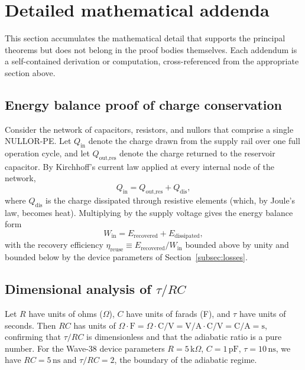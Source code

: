 \section{Detailed mathematical addenda}
\label{sec:math_addenda}

This section accumulates the mathematical detail that supports the principal
theorems but does not belong in the proof bodies themselves.  Each addendum is a
self-contained derivation or computation, cross-referenced from the appropriate
section above.

\subsection{Energy balance proof of charge conservation}
\label{subsec:charge_balance}

Consider the network of capacitors, resistors, and nullors that comprise a
single NULLOR-PE.  Let $Q_{\text{in}}$ denote the charge drawn from the supply rail
over one full operation cycle, and let $Q_{\text{out,res}}$ denote the charge
returned to the reservoir capacitor.  By Kirchhoff's current law applied at every
internal node of the network,
\[
  Q_{\text{in}} = Q_{\text{out,res}} + Q_{\text{dis}},
\]
where $Q_{\text{dis}}$ is the charge dissipated through resistive elements (which,
by Joule's law, becomes heat).  Multiplying by the supply voltage gives the energy
balance form
\[
  W_{\text{in}} = E_{\text{recovered}} + E_{\text{dissipated}},
\]
with the recovery efficiency $\eta_{\text{reuse}} \equiv E_{\text{recovered}} /
W_{\text{in}}$ bounded above by unity and bounded below by the device parameters
of Section~\ref{subsec:losses}.

\subsection{Dimensional analysis of $\tau / RC$}
\label{subsec:dim_tau_rc}

Let $R$ have units of ohms ($\Omega$), $C$ have units of farads (F), and $\tau$
have units of seconds.  Then $RC$ has units of $\Omega \cdot \text{F} = \Omega
\cdot \text{C}/\text{V} = \text{V}/\text{A} \cdot \text{C}/\text{V} = \text{C}/\text{A}
= \text{s}$, confirming that $\tau / RC$ is dimensionless and that the adiabatic
ratio is a pure number.  For the Wave-38 device parameters $R = 5\,\text{k}\Omega$,
$C = 1\,\text{pF}$, $\tau = 10\,\text{ns}$, we have $RC = 5\,\text{ns}$ and
$\tau / RC = 2$, the boundary of the adiabatic regime.

